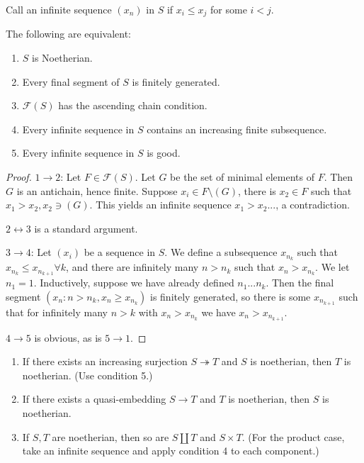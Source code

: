 Call an infinite sequence $(x_n)$ in $S$  if $x_i \leq x_j$ for some $i<j$.
\begin{proposition} %
The following are equivalent:
\begin{enumerate}
	\item  $S$ is Noetherian.
	\item  Every final segment of $S$ is finitely generated.
	\item  $\mathcal{F}(S)$ has the ascending chain condition.
	\item  Every infinite sequence in $S$ contains an increasing finite subsequence.
	\item  Every infinite sequence in $S$ is good.
\end{enumerate}
 \end{proposition}

\begin{proof} %
$1 \rightarrow 2$: Let $F \in \mathcal{F}(S)$. Let $G$ be the set of minimal elements of $F$. Then $G$ is an antichain, hence finite. Suppose $x_i \in F \setminus (G)$, there is $x_2 \in F$ such that $x_1 > x_2, x_2 \ni (G)$. This yields an infinite sequence $x_1 > x_2...$, a contradiction.

$2 \leftrightarrow 3$ is a standard argument.

$3 \rightarrow 4$: Let $(x_i)$ be a sequence in $S$. We define a subsequence $x_{n_k}$ such that $x_{n_k} \leq x_{n_{k+1}} \forall k$, and there are infinitely many $n > n_k$ such that $x_n > x_{n_k}$. We let $n_1 = 1$. Inductively, suppose we have already defined $n_1...n_k$. Then the final segment $(x_n: n > n_k, x_n \geq x_{n_k})$ is finitely generated, so there is some $x_{n_{k+1}}$ such that for infinitely many $n>k$ with $x_n > x_{n_k}$ we have $x_n > x_{n_{k+1}}$.

$4 \rightarrow 5$ is obvious, as is $5 \rightarrow 1$.
 \end{proof}

\begin{corollary} %
\begin{enumerate}
	\item If there exists an increasing surjection $S \twoheadrightarrow T$ and $S$ is noetherian, then $T$ is noetherian. (Use condition 5.)
	\item If there exists a quasi-embedding $S \rightarrow T$ and $T$ is noetherian, then $S$ is noetherian.
	\item If $S, T$ are noetherian, then so are $S \coprod T$ and $S \times T$. (For the product case, take an infinite sequence and apply condition 4 to each component.)
\end{enumerate}
 \end{corollary}

